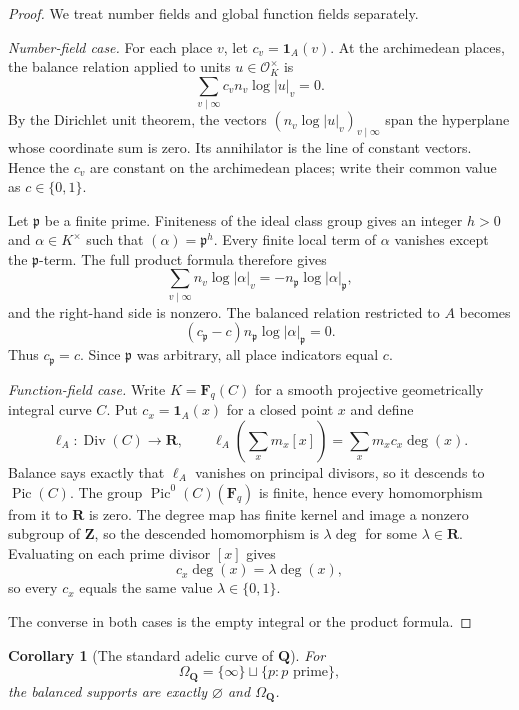 \documentclass[11pt]{amsart}
\numberwithin{equation}{section}
\newtheorem{corollary}[theorem]{Corollary}
\theoremstyle{definition}
\newcommand{\Z}{\mathbf Z}
\newcommand{\Q}{\mathbf Q}
\newcommand{\R}{\mathbf R}
\begin{document}
\begin{proof}
We treat number fields and global function fields separately.

\emph{Number-field case.}
For each place $v$, let $c_v=\mathbf1_A(v)$.  At the archimedean places,
the balance relation applied to units $u\in\mathcal O_K^\times$ is
\[
\sum_{v\mid\infty}c_v n_v\log|u|_v=0.
\]
By the Dirichlet unit theorem, the vectors
$(n_v\log|u|_v)_{v\mid\infty}$ span the hyperplane whose coordinate sum
is zero.  Its annihilator is the line of constant vectors.  Hence the
$c_v$ are constant on the archimedean places; write their common value as
$c\in\{0,1\}$.

Let $\mathfrak p$ be a finite prime.  Finiteness of the ideal class group
gives an integer $h>0$ and $\alpha\in K^\times$ such that
$(\alpha)=\mathfrak p^h$.  Every finite local term of $\alpha$ vanishes
except the $\mathfrak p$-term.  The full product formula therefore gives
\[
\sum_{v\mid\infty}n_v\log|\alpha|_v
=-n_{\mathfrak p}\log|\alpha|_{\mathfrak p},
\]
and the right-hand side is nonzero.  The balanced relation restricted to
$A$ becomes
\[
(c_{\mathfrak p}-c)
 n_{\mathfrak p}\log|\alpha|_{\mathfrak p}=0.
\]
Thus $c_{\mathfrak p}=c$.  Since $\mathfrak p$ was arbitrary, all place
indicators equal $c$.

\emph{Function-field case.}
Write $K=\mathbf F_q(C)$ for a smooth projective geometrically integral
curve $C$.  Put $c_x=\mathbf1_A(x)$ for a closed point $x$ and define
\[
\ell_A:\operatorname{Div}(C)\longrightarrow\R,
\qquad
\ell_A\!\left(\sum_xm_x[x]\right)
=\sum_xm_xc_x\deg(x).
\]
Balance says exactly that $\ell_A$ vanishes on principal divisors, so it
descends to $\operatorname{Pic}(C)$.  The group
$\operatorname{Pic}^0(C)(\mathbf F_q)$ is finite, hence every homomorphism
from it to $\R$ is zero.  The degree map has finite kernel and image a
nonzero subgroup of $\Z$, so the descended homomorphism is
$\lambda\deg$ for some $\lambda\in\R$.  Evaluating on each prime divisor
$[x]$ gives
\[
c_x\deg(x)=\lambda\deg(x),
\]
so every $c_x$ equals the same value $\lambda\in\{0,1\}$.

The converse in both cases is the empty integral or the product formula.
\end{proof}

\begin{corollary}[The standard adelic curve of $\Q$]
\label{thm:q-balanced-supports}
For
\[
\Omega_\Q=\{\infty\}\sqcup\{p:p\text{ prime}\},
\]
the balanced supports are exactly $\varnothing$ and $\Omega_\Q$.
\end{corollary}
\end{document}
